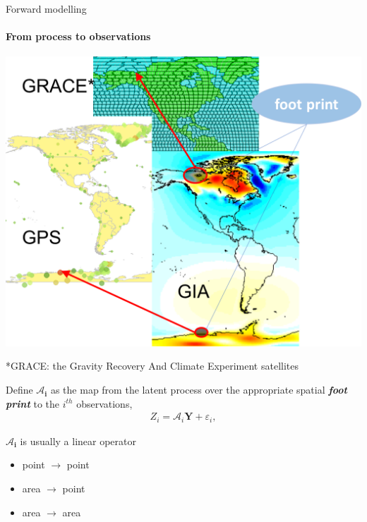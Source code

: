 \documentclass{beamer}
\begin{document}
\begin{frame}{Forward modelling}
\framesubtitle{From process to observations}

\begin{minipage}[c]{0.48\textwidth}
\begin{center}
\includegraphics[width = \textwidth]{images/footprint}
\end{center}
\tiny{*GRACE: the Gravity Recovery And Climate Experiment satellites}

\end{minipage}%
\hfill
\begin{minipage}[c]{0.5\textwidth}
Define $\bm{\mathcal{A}_i}$ as the map from the latent process over the appropriate spatial \emph{\textbf{foot print}} to the $i^{th}$ observations,
\begin{align}\label{eq:GPSi}
Z_i = \bm{\mathcal{A}}_i\bm{Y} + \varepsilon_i, 
\end{align} 

 $\bm{\mathcal{A}_i}$ is usually a linear operator 
 \begin{itemize}
 \item point $\to$ point
 \item area $\to$ point
 \item area $\to$ area
 \end{itemize}
\end{minipage}

\end{frame}
\end{document}
